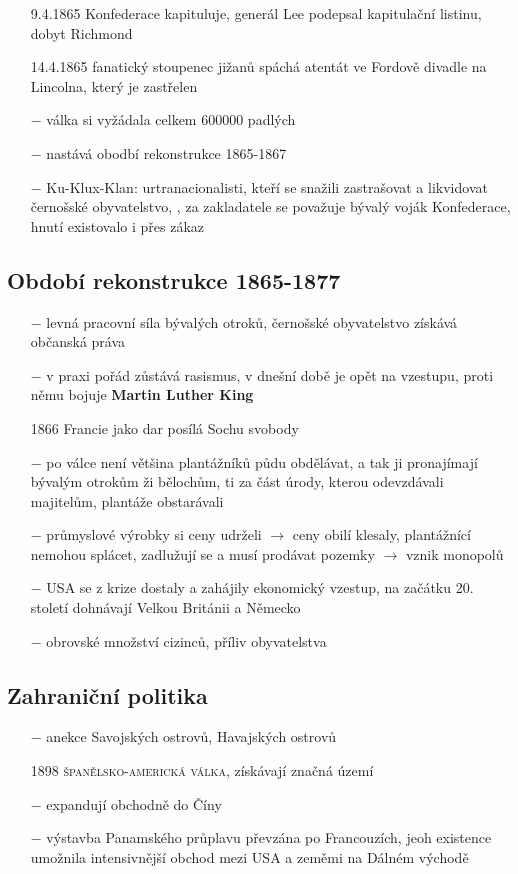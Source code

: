 \documentclass{article}
\begin{document}
\begin{itemize}
    \item[9.4.1865] Konfederace kapituluje, generál Lee podepsal kapitulační listinu, dobyt Richmond
    \item[14.4.1865] fanatický stoupenec jižanů spáchá atentát ve Fordově divadle na Lincolna, který je zastřelen
    \item[$-$] válka si vyžádala celkem 600000 padlých
    \item[$-$] nastává obodbí rekonstrukce 1865-1867
    \item[$-$] Ku-Klux-Klan: urtranacionalisti, kteří se snažili zastrašovat a likvidovat černošské obyvatelstvo, , za zakladatele se považuje bývalý voják Konfederace, hnutí existovalo i přes zákaz
\end{itemize}

\subsection*{Období rekonstrukce 1865-1877}
\begin{itemize}
    \vspace{-0.5em}
    \setlength\itemsep{0.15em}
    \item[$-$] levná pracovní síla bývalých otroků, černošské obyvatelstvo získává občanská práva
    \item[$-$] v praxi pořád zůstává rasismus, v dnešní době je opět na vzestupu, proti němu bojuje \textbf{Martin Luther King}
    \item[1866] Francie jako dar posílá Sochu svobody
    \item[$-$] po válce není většina plantážníků půdu obdělávat, a tak ji pronajímají bývalým otrokům ži bělochům, ti za část úrody, kterou odevzdávali majitelům, plantáže obstarávali
    \item[$-$] průmyslové výrobky si ceny udrželi $\rightarrow$ ceny obilí klesaly, plantážnící nemohou splácet, zadlužují se a musí prodávat pozemky $\rightarrow$ vznik monopolů
    \item[$-$] USA se z krize dostaly a zahájily ekonomický vzestup, na začátku 20. století dohnávají Velkou Británii a Německo
    \item[$-$] obrovské množství cizinců, příliv obyvatelstva
\end{itemize}

\subsection*{Zahraniční politika}
\begin{itemize}
    \vspace{-0.5em}
    \setlength\itemsep{0.15em}
    \item[$-$] anekce Savojských ostrovů, Havajských ostrovů
    \item[1898] \textsc{španělsko-americká válka}, získávají značná území
    \item[$-$] expandují obchodně do Číny
    \item[$-$] výstavba Panamského průplavu převzána po Francouzích, jeoh existence umožnila intensivnější obchod mezi USA a zeměmi na Dálném východě
\end{itemize}
\end{document}
